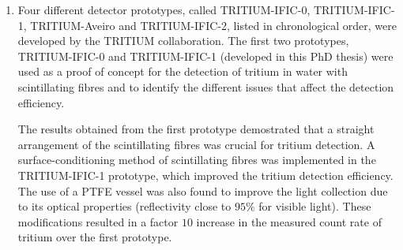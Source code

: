 \begin{enumerate}

\item{} Four different detector prototypes, called TRITIUM-IFIC-0, TRITIUM-IFIC-1, TRITIUM-Aveiro and TRITIUM-IFIC-2, listed in chronological order, were developed by the TRITIUM collaboration. The first two prototypes, TRITIUM-IFIC-0 and TRITIUM-IFIC-1 (developed in this PhD thesis) were used as a proof of concept for the detection of tritium in water with scintillating fibres and to identify the different issues that affect the detection efficiency. %

The results obtained from the first prototype demostrated that a straight arrangement of the scintillating fibres was crucial for tritium detection. A surface-conditioning method of scintillating fibres was implemented in the TRITIUM-IFIC-1 prototype, which improved the tritium detection efficiency. The use of a PTFE vessel was also found to improve the light collection due to its optical properties (reflectivity close to $95\%$ for visible light). These modifications resulted in a factor $10$ increase in the measured count rate of tritium over the first prototype. %


\end{enumerate}
